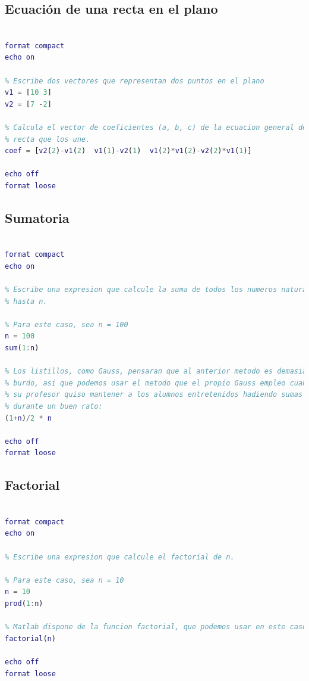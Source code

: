 \subsection{Ecuación de una recta en el plano}
\begin{lstlisting}[language=Matlab]
% Ejercicio 9. Ecuacion de una recta en el plano

format compact
echo on

% Escribe dos vectores que representan dos puntos en el plano
v1 = [10 3]
v2 = [7 -2]

% Calcula el vector de coeficientes (a, b, c) de la ecuacion general de la
% recta que los une.
coef = [v2(2)-v1(2)  v1(1)-v2(1)  v1(2)*v1(2)-v2(2)*v1(1)]

echo off
format loose
\end{lstlisting}


\subsection{Sumatoria}
\begin{lstlisting}[language=Matlab]
% Ejercicio 10. Sumatoria

format compact
echo on

% Escribe una expresion que calcule la suma de todos los numeros naturales
% hasta n.

% Para este caso, sea n = 100
n = 100
sum(1:n)

% Los listillos, como Gauss, pensaran que al anterior metodo es demasiado
% burdo, asi que podemos usar el metodo que el propio Gauss empleo cuando
% su profesor quiso mantener a los alumnos entretenidos hadiendo sumas
% durante un buen rato:
(1+n)/2 * n

echo off
format loose
\end{lstlisting}


\subsection{Factorial}
\begin{lstlisting}[language=Matlab]
% Ejercicio 11. Factorial

format compact
echo on

% Escribe una expresion que calcule el factorial de n.

% Para este caso, sea n = 10
n = 10
prod(1:n)

% Matlab dispone de la funcion factorial, que podemos usar en este caso:
factorial(n)

echo off
format loose
\end{lstlisting}


